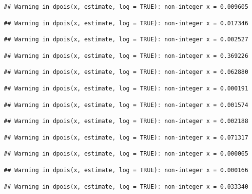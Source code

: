 \documentclass[]{article}
\begin{document}
\begin{verbatim}
## Warning in dpois(x, estimate, log = TRUE): non-integer x = 0.009605
\end{verbatim}

\begin{verbatim}
## Warning in dpois(x, estimate, log = TRUE): non-integer x = 0.017346
\end{verbatim}

\begin{verbatim}
## Warning in dpois(x, estimate, log = TRUE): non-integer x = 0.002527
\end{verbatim}

\begin{verbatim}
## Warning in dpois(x, estimate, log = TRUE): non-integer x = 0.369226
\end{verbatim}

\begin{verbatim}
## Warning in dpois(x, estimate, log = TRUE): non-integer x = 0.062880
\end{verbatim}

\begin{verbatim}
## Warning in dpois(x, estimate, log = TRUE): non-integer x = 0.000191
\end{verbatim}

\begin{verbatim}
## Warning in dpois(x, estimate, log = TRUE): non-integer x = 0.001574
\end{verbatim}

\begin{verbatim}
## Warning in dpois(x, estimate, log = TRUE): non-integer x = 0.002188
\end{verbatim}

\begin{verbatim}
## Warning in dpois(x, estimate, log = TRUE): non-integer x = 0.071317
\end{verbatim}

\begin{verbatim}
## Warning in dpois(x, estimate, log = TRUE): non-integer x = 0.000065
\end{verbatim}

\begin{verbatim}
## Warning in dpois(x, estimate, log = TRUE): non-integer x = 0.000166
\end{verbatim}

\begin{verbatim}
## Warning in dpois(x, estimate, log = TRUE): non-integer x = 0.033340
\end{verbatim}
\end{document}
